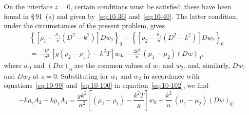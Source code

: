 On the interface $z = 0$, certain conditions must be satisfied; these have been found in \S\,91~(a) and given by~\eqref{eq:10-36} and~\eqref{eq:10-40}. The latter condition, under the circumstances of the present problem, gives
\begin{align}
\label{eq:10-102}
\left\{\!\left[\rho_1-\frac{\mu_1}{n}(D^2-k^2)\right]\!Dw_1\right\}_0 - \left\{\!\left[\rho_2-\frac{\mu_2}{n}(D^2-k^2)\right]\!Dw_2\right\}_0 \nonumber\\
= -\frac{k^2}{n^2}\,[g(\rho_2-\rho_1)-k^2T]w_{0s} - \frac{2k^2}{n}\,(\mu_1-\mu_2)(Dw)_0,
\end{align}
where $w_0$ and $(Dw)_0$ are the common values of $w_1$ and $w_2$, and, similarly, $Dw_1$ and $Dw_2$ at $z = 0$. Substituting for $w_1$ and $w_2$ in accordance with equations~\eqref{eq:10-99} and~\eqref{eq:10-100} in equation~\eqref{eq:10-102}, we find
\begin{equation}
\label{eq:10-103}
-k\rho_2A_2-k\rho_1A_1 = \frac{gk^2}{n^2}\!\left[(\rho_2-\rho_1)-\frac{k^2T}{g}\right]\!w_0 + \frac{k^2}{n}\,(\mu_1-\mu_2)(Dw)_0.
\end{equation}

